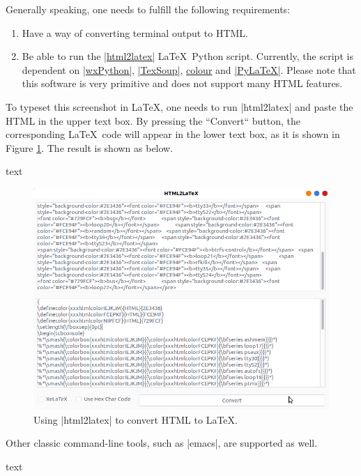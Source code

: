 \documentclass[letterpaper, 11pt, DIV=11]{scrartcl}
\begin{document}
Generally speaking, one needs to fulfill the following requirements:
\begin{enumerate}
\item Have a way of converting terminal output to HTML.
\item Be able to run the \href{https://github.com/xziyue/latex-beautiful-listings-screenshot/blob/master/html2tex_gui.py}{\rawinline|html2latex|} \LaTeX\ Python script. Currently, the script is dependent on \href{https://pypi.org/project/wxPython/}{\rawinline|wxPython|}, \href{https://pypi.org/project/TexSoup/}{\rawinline|TexSoup|}, \href{https://pypi.org/project/colour/}{colour} and \href{https://pypi.org/project/PyLaTeX/}{\rawinline|PyLaTeX|}. Please note that this software is very primitive and does not support many HTML features.
\end{enumerate}

To typeset this screenshot in \LaTeX, one needs to run \rawinline|html2latex| and paste the HTML in the upper text box. By pressing the ``Convert`` button, the corresponding \LaTeX\ code will appear in the lower text box, as it is shown in Figure \ref{fig:python-html2latex}. The result is shown as below.

\begin{tcbsrccode}{text}

\end{tcbsrccode}


\begin{figure}[htpb]
\centering
\includegraphics[width=0.7\linewidth]{../res/html2latex}
\caption{Using \rawinline|html2latex| to convert HTML to \LaTeX.}
\label{fig:python-html2latex}
\end{figure} 

Other classic command-line tools, such as \rawinline|emacs|, are supported as well.

\begin{tcbsrccode}{text}

\end{tcbsrccode}

\end{document}
